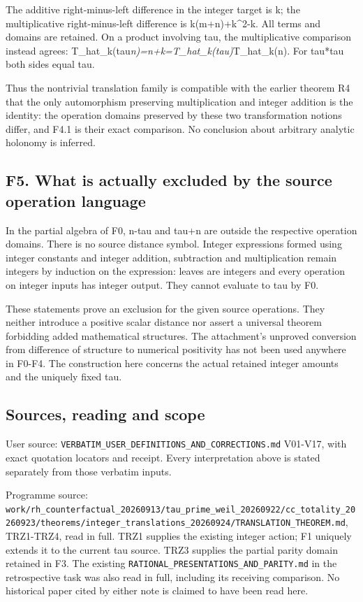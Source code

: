 \documentclass[
]{article}
\begin{document}
The additive right-minus-left difference in the integer target is k; the
multiplicative right-minus-left difference is k(m+n)+k\^{}2-k. All terms
and domains are retained. On a product involving tau, the multiplicative
comparison instead agrees:
T\_hat\_k(tau\emph{n)=n+k=T\_hat\_k(tau)}T\_hat\_k(n). For tau*tau both
sides equal tau.

Thus the nontrivial translation family is compatible with the earlier
theorem R4 that the only automorphism preserving multiplication and
integer addition is the identity: the operation domains preserved by
these two transformation notions differ, and F4.1 is their exact
comparison. No conclusion about arbitrary analytic holonomy is inferred.

\subsection{F5. What is actually excluded by the source operation
language}\label{f5.-what-is-actually-excluded-by-the-source-operation-language}

In the partial algebra of F0, n-tau and tau+n are outside the respective
operation domains. There is no source distance symbol. Integer
expressions formed using integer constants and integer addition,
subtraction and multiplication remain integers by induction on the
expression: leaves are integers and every operation on integer inputs
has integer output. They cannot evaluate to tau by F0.

These statements prove an exclusion for the given source operations.
They neither introduce a positive scalar distance nor assert a universal
theorem forbidding added mathematical structures. The attachment's
unproved conversion from difference of structure to numerical positivity
has not been used anywhere in F0-F4. The construction here concerns the
actual retained integer amounts and the uniquely fixed tau.

\subsection{Sources, reading and scope}\label{sources-reading-and-scope}

User source: \nolinkurl{VERBATIM_USER_DEFINITIONS_AND_CORRECTIONS.md} V01-V17,
with exact quotation locators and receipt. Every interpretation above is
stated separately from those verbatim inputs.

Programme source:
\nolinkurl{work/rh_counterfactual_20260913/tau_prime_weil_20260922/cc_totality_20260923/theorems/integer_translations_20260924/TRANSLATION_THEOREM.md},
TRZ1-TRZ4, read in full. TRZ1 supplies the existing integer action; F1
uniquely extends it to the current tau source. TRZ3 supplies the partial
parity domain retained in F3. The existing
\nolinkurl{RATIONAL_PRESENTATIONS_AND_PARITY.md} in the retrospective task was
also read in full, including its receiving comparison. No historical
paper cited by either note is claimed to have been read here.
\end{document}
